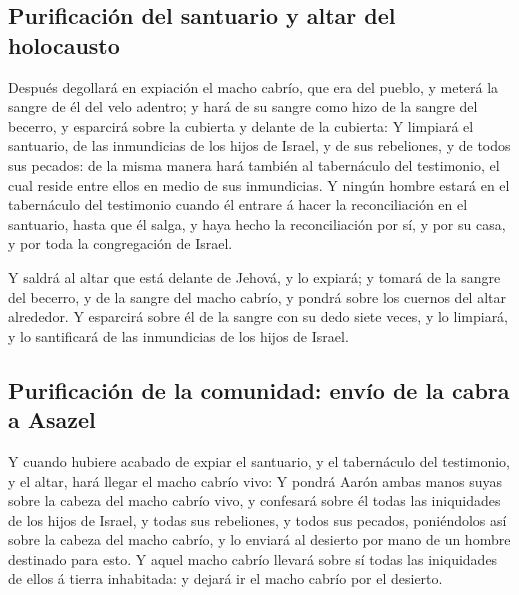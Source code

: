 \hypertarget{purificaciuxf3n-del-santuario-y-altar-del-holocausto}{%
\subsection{Purificación del santuario y altar del
holocausto}\label{purificaciuxf3n-del-santuario-y-altar-del-holocausto}}

 Después degollará en expiación el macho cabrío, que era
del pueblo, y meterá la sangre de él del velo adentro; y hará de su
sangre como hizo de la sangre del becerro, y esparcirá sobre la cubierta
y delante de la cubierta:  Y limpiará el santuario, de las
inmundicias de los hijos de Israel, y de sus rebeliones, y de todos sus
pecados: de la misma manera hará también al tabernáculo del testimonio,
el cual reside entre ellos en medio de sus inmundicias.  Y
ningún hombre estará en el tabernáculo del testimonio cuando él entrare
á hacer la reconciliación en el santuario, hasta que él salga, y haya
hecho la reconciliación por sí, y por su casa, y por toda la
congregación de Israel.

 Y saldrá al altar que está delante de Jehová, y lo
expiará; y tomará de la sangre del becerro, y de la sangre del macho
cabrío, y pondrá sobre los cuernos del altar alrededor.  Y
esparcirá sobre él de la sangre con su dedo siete veces, y lo limpiará,
y lo santificará de las inmundicias de los hijos de Israel.

\hypertarget{purificaciuxf3n-de-la-comunidad-envuxedo-de-la-cabra-a-asazel}{%
\subsection{Purificación de la comunidad: envío de la cabra a
Asazel}\label{purificaciuxf3n-de-la-comunidad-envuxedo-de-la-cabra-a-asazel}}

 Y cuando hubiere acabado de expiar el santuario, y el
tabernáculo del testimonio, y el altar, hará llegar el macho cabrío
vivo:  Y pondrá Aarón ambas manos suyas sobre la cabeza del
macho cabrío vivo, y confesará sobre él todas las iniquidades de los
hijos de Israel, y todas sus rebeliones, y todos sus pecados,
poniéndolos así sobre la cabeza del macho cabrío, y lo enviará al
desierto por mano de un hombre destinado para esto.  Y
aquel macho cabrío llevará sobre sí todas las iniquidades de ellos á
tierra inhabitada: y dejará ir el macho cabrío por el desierto.

